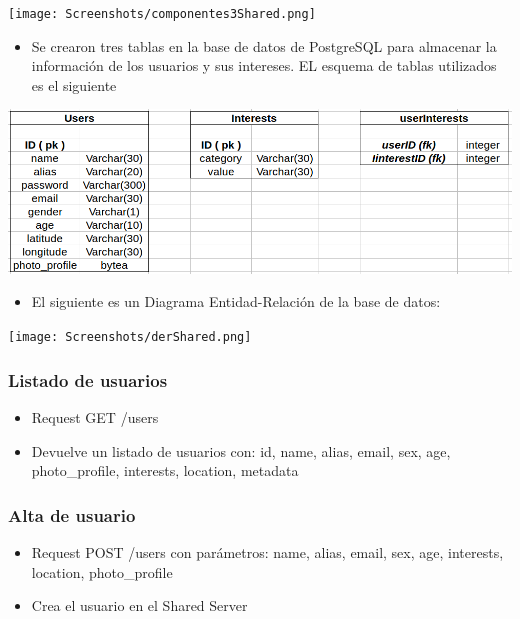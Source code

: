\documentclass[letterpaper,10pt,english]{sphinxmanual}
\begin{document}
\texttt{[image: Screenshots/componentes3Shared.png]}
\begin{itemize}
\item {} 
Se crearon tres tablas en la base de datos de PostgreSQL para almacenar la información de los usuarios y sus intereses. EL esquema de tablas utilizados es el siguiente

\end{itemize}

\includegraphics{tablasShared.png}
\begin{itemize}
\item {} 
El siguiente es un Diagrama Entidad-Relación de la base de datos:

\end{itemize}

\texttt{[image: Screenshots/derShared.png]}


\subsubsection{Listado de usuarios}
\label{manuals:listado-de-usuarios}\begin{itemize}
\item {} 
Request GET /users

\item {} 
Devuelve un listado de usuarios con: id, name, alias, email, sex, age, photo\_profile, interests, location, metadata

\end{itemize}


\subsubsection{Alta de usuario}
\label{manuals:alta-de-usuario}\begin{itemize}
\item {} 
Request POST /users con parámetros: name, alias, email, sex, age, interests, location, photo\_profile

\item {} 
Crea el usuario en el Shared Server

\end{itemize}
\end{document}
